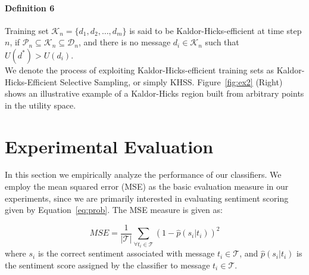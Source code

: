 \documentclass{sig-alternate}
\begin{document}
\paragraph*{\bf{Definition 6}} Training set $\mathcal{K}_n=\{d_1, d_2, \ldots, d_m\}$ is said to be Kaldor-Hicks-efficient at time step $n$, if $\mathcal{P}_n\subseteq\mathcal{K}_n\subseteq\mathcal{D}_n$, and there is no message $d_i\in\mathcal{K}_n$ such that $U(d^*)>U(d_i)$.\\

We denote the process of exploiting Kaldor-Hicks-efficient training sets as
Kaldor-Hicks-Efficient Selective Sampling, or simply KHSS. Figure~\ref{fig:ex2} (Right) shows an illustrative example of a Kaldor-Hicks region built from arbitrary points in the utility space.

%
%
\section{Experimental Evaluation}

In this section we empirically analyze the performance of our classifiers. We employ the mean squared error (MSE) as the basic evaluation measure in our experiments, since we are primarily interested in evaluating sentiment scoring given by Equation~\ref{eq:prob}. The MSE measure is given as: 

\begin{equation}
\label{rmse}
\mathit{MSE} = \displaystyle\frac{1}{|\mathcal{T}|} \displaystyle\sum_{\forall t_i\in\mathcal{T}} (1 - \hat{p}(s_i|t_i))^2
\end{equation}
\noindent where $s_i$ is the correct sentiment associated with message $t_i\in\mathcal{T}$, and $\hat{p}(s_i|t_i)$ is the sentiment score assigned by the classifier to message $t_i\in\mathcal{T}$.
\end{document}
